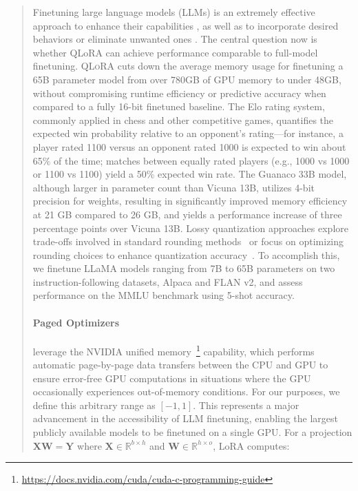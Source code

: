 \begin{quote}
Finetuning large language models (LLMs) is an extremely effective approach to enhance their capabilities \citep{min2021metaicl, wei2021finetuned, ouyang2022training, wang2022super, wang2022self, liu2022few}, as well as to incorporate desired behaviors or eliminate unwanted ones \citep{ouyang2022training, askell2021general, bai2022training}. The central question now is whether QLoRA can achieve performance comparable to full-model finetuning. \textsc{QLoRA} cuts down the average memory usage for finetuning a 65B parameter model from over 780GB of GPU memory to under 48GB, without compromising runtime efficiency or predictive accuracy when compared to a fully 16-bit finetuned baseline. The Elo rating system, commonly applied in chess and other competitive games, quantifies the expected win probability relative to an opponent’s rating—for instance, a player rated 1100 versus an opponent rated 1000 is expected to win about 65\% of the time; matches between equally rated players (e.g., 1000 vs 1000 or 1100 vs 1100) yield a 50\% expected win rate. The {Guanaco} 33B model, although larger in parameter count than Vicuna 13B, utilizes 4-bit precision for weights, resulting in significantly improved memory efficiency at 21 GB compared to 26 GB, and yields a performance increase of three percentage points over Vicuna 13B. Lossy quantization approaches explore trade-offs involved in standard rounding methods~\citep{dettmers2022case,zeng2022glm,pope2022efficiently} or focus on optimizing rounding choices to enhance quantization accuracy~\citep{frantar2022gptq}. To accomplish this, we finetune LLaMA models ranging from 7B to 65B parameters on two instruction-following datasets, Alpaca and FLAN v2, and assess performance on the MMLU benchmark using 5-shot accuracy. \paragraph{Paged Optimizers} leverage the NVIDIA unified memory~\footnote{\tiny \url{https://docs.nvidia.com/cuda/cuda-c-programming-guide}} capability, which performs automatic page-by-page data transfers between the CPU and GPU to ensure error-free GPU computations in situations where the GPU occasionally experiences out-of-memory conditions. For our purposes, we define this arbitrary range as $[-1, 1]$. This represents a major advancement in the accessibility of LLM finetuning, enabling the largest publicly available models to be finetuned on a single GPU. For a projection ${\mathbf{X} \mathbf{W} = \mathbf{Y}}$ where $\mathbf{X}\in  \mathbb{R}^{b\times h}$ and $\mathbf{W}\in  \mathbb{R}^{h\times o}$, LoRA computes:


\end{quote}
